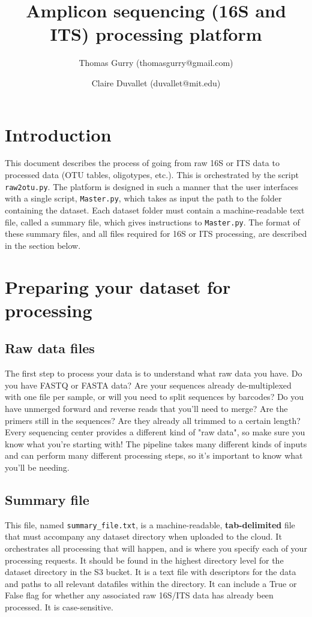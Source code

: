 \documentclass[11pt, oneside]{article}   	%
\title{Amplicon sequencing (16S and ITS) processing platform}
\author{Thomas Gurry (thomasgurry@gmail.com)}
\author{Claire Duvallet (duvallet@mit.edu)}
\affil{Center for Microbiome Informatics and Therapeutics}
\date{}							%
\begin{document}
\maketitle
\tableofcontents
\section{Introduction}
This document describes the process of going from raw 16S or ITS data to processed data (OTU tables, oligotypes, etc.).  This is orchestrated by the script {\tt raw2otu.py}.  The platform is designed in such a manner that the user interfaces with a single script, {\tt Master.py}, which takes as input the path to the folder containing the dataset.  Each dataset folder must contain a machine-readable text file, called a summary file, which gives instructions to {\tt Master.py}.  The format of these summary files, and all files required for 16S or ITS processing, are described in the section below.

\section{Preparing your dataset for processing}
\subsection{Raw data files}
The first step to process your data is to understand what raw data you have.
Do you have FASTQ or FASTA data? Are your sequences already de-multiplexed with
one file per sample, or will you need to split sequences by barcodes?
Do you have unmerged forward and reverse reads that you'll need to merge?
Are the primers still in the sequences? Are they already all trimmed to a certain
length? Every sequencing center provides a different kind of "raw data", so
make sure you know what you're starting with! The pipeline takes many different
kinds of inputs and can perform many different processing steps, so it's
important to know what you'll be needing.

\subsection{Summary file}
This file, named {\tt summary\_file.txt}, is a machine-readable, \textbf{tab-delimited} 
file that must accompany any dataset directory when uploaded to the cloud. 
It orchestrates all processing that will happen, and is where you specify each
of your processing requests. It should be found in the highest directory level 
for the dataset directory in the S3 bucket.  It is a text file with descriptors 
for the data and paths to all relevant datafiles within the directory.  
It can include a True or False flag for whether any associated raw 16S/ITS data has 
already been processed. It is case-sensitive.
\end{document}
